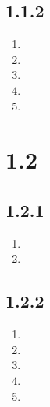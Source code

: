 \documentclass[12pt]{article}
\begin{document}
\subsection*{1.1.2}
\begin{enumerate}[a]
	\item %
	\item %
	\item %
	\item %
	\item %
\end{enumerate}

\section*{1.2}
\subsection*{1.2.1}
\begin{enumerate}[a]
	\item %
	\item %
\end{enumerate}

\subsection*{1.2.2}
\begin{enumerate}[a]
	\item %
	\item %
	\item %
	\item %
	\item %
\end{enumerate}
\end{document}
